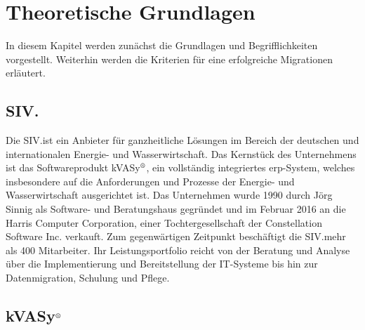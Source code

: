 
\chapter{Theoretische Grundlagen}

In diesem Kapitel werden zunächst die Grundlagen und Begrifflichkeiten vorgestellt. Weiterhin werden die Kriterien für eine erfolgreiche Migrationen erläutert.

\section{SIV.\@AG}\label{SIV.AG}

Die SIV.\@AG ist ein Anbieter für ganzheitliche Lösungen im Bereich der deutschen und internationalen Energie- und Wasserwirtschaft. Das Kernstück des Unternehmens ist das Softwareprodukt kVASy$^\text{\textregistered}$, ein vollständig integriertes \acrfull{erp}-System, welches insbesondere auf die Anforderungen und Prozesse der Energie- und Wasserwirtschaft ausgerichtet ist. Das Unternehmen wurde 1990 durch Jörg Sinnig als Software- und Beratungshaus gegründet und im Februar 2016 an die Harris Computer Corporation, einer Tochtergesellschaft der Constellation Software Inc. verkauft. Zum gegenwärtigen Zeitpunkt beschäftigt die SIV.\@AG mehr als 400 Mitarbeiter. Ihr Leistungsportfolio reicht von der Beratung und Analyse über die Implementierung und Bereitstellung der IT-Systeme bis hin zur Datenmigration, Schulung und Pflege. \cite{SIV13}

\section{kVASy$^\text{\textregistered}$}\label{kvasy} 

